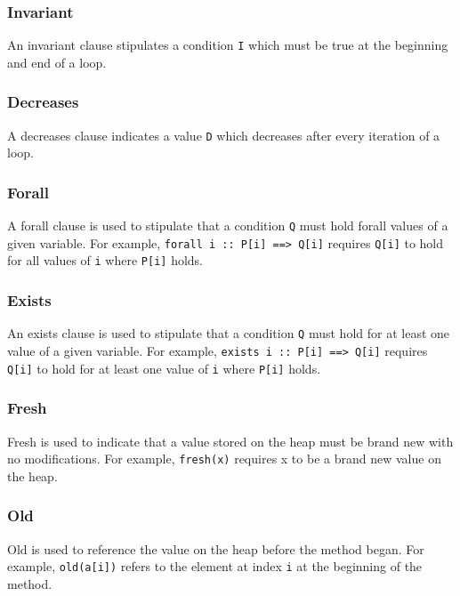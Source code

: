 \subsubsection{Invariant}
An invariant clause stipulates a condition \verb!I! which must be true at the beginning and end of a loop.
\subsubsection{Decreases}
A decreases clause indicates a value \verb!D! which decreases after every iteration of a loop.
\subsubsection{Forall}
A forall clause is used to stipulate that a condition \verb!Q! must hold forall values of a given variable.
For example, \verb!forall i :: P[i] ==> Q[i]! requires \verb!Q[i]! to hold for all values of \verb!i! where \verb!P[i]! holds.
\subsubsection{Exists}
An exists clause is used to stipulate that a condition \verb!Q! must hold for at least one value of a given variable.
For example, \verb!exists i :: P[i] ==> Q[i]! requires \verb!Q[i]! to hold for at least one value of \verb!i! where \verb!P[i]! holds.
\subsubsection{Fresh}
Fresh is used to indicate that a value stored on the heap must be brand new with no modifications.
For example, \verb!fresh(x)! requires x to be a brand new value on the heap.
\subsubsection{Old}
Old is used to reference the value on the heap before the method began. 
For example, \verb!old(a[i])! refers to the element at index \verb!i! at the beginning of the method.
